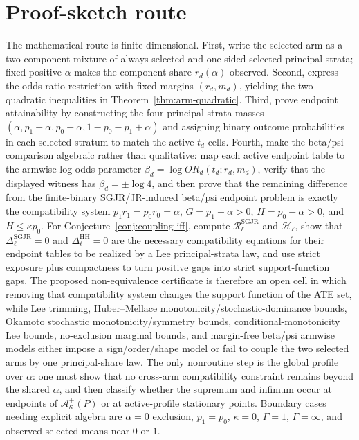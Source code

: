 \documentclass[11pt]{article}
\theoremstyle{definition}
\theoremstyle{plain}
\theoremstyle{remark}
\begin{document}
\section{Proof-sketch route}
The mathematical route is finite-dimensional.  First, write the selected arm as a two-component mixture of always-selected and one-sided-selected principal strata; fixed positive \(\alpha\) makes the component share \(r_d(\alpha)\) observed.  Second, express the odds-ratio restriction with fixed margins \((r_d,m_d)\), yielding the two quadratic inequalities in Theorem~\ref{thm:arm-quadratic}.  Third, prove endpoint attainability by constructing the four principal-strata masses \((\alpha,p_1-\alpha,p_0-\alpha,1-p_0-p_1+\alpha)\) and assigning binary outcome probabilities in each selected stratum to match the active \(t_d\) cells.  Fourth, make the beta/psi comparison algebraic rather than qualitative: map each active endpoint table to the armwise log-odds parameter \(\beta_d=\log OR_d(t_d;r_d,m_d)\), verify that the displayed witness has \(\beta_d=\pm\log 4\), and then prove that the remaining difference from the finite-binary SGJR/JR-induced beta/psi endpoint problem is exactly the compatibility system \(p_1r_1=p_0r_0=\alpha\), \(G=p_1-\alpha>0\), \(H=p_0-\alpha>0\), and \(H\le\kappa p_0\).  For Conjecture~\ref{conj:coupling-iff}, compute \(\mathcal R_\ell^{\mathrm{SGJR}}\) and \(\mathcal H_\ell\), show that \(\Delta_\ell^{\mathrm{SGJR}}=0\) and \(\Delta_\ell^{\mathrm{HH}}=0\) are the necessary compatibility equations for their endpoint tables to be realized by a Lee principal-strata law, and use strict exposure plus compactness to turn positive gaps into strict support-function gaps.  The proposed non-equivalence certificate is therefore an open cell in which removing that compatibility system changes the support function of the ATE set, while Lee trimming, Huber--Mellace monotonicity/stochastic-dominance bounds, Okamoto stochastic monotonicity/symmetry bounds, conditional-monotonicity Lee bounds, no-exclusion marginal bounds, and margin-free beta/psi armwise models either impose a sign/order/shape model or fail to couple the two selected arms by one principal-share law.  The only nonroutine step is the global profile over \(\alpha\): one must show that no cross-arm compatibility constraint remains beyond the shared \(\alpha\), and then classify whether the supremum and infimum occur at endpoints of \(\mathcal A_\kappa^+(P)\) or at active-profile stationary points.  Boundary cases needing explicit algebra are \(\alpha=0\) exclusion, \(p_1=p_0\), \(\kappa=0\), \(\Gamma=1\), \(\Gamma=\infty\), and observed selected means near \(0\) or \(1\).
\end{document}
